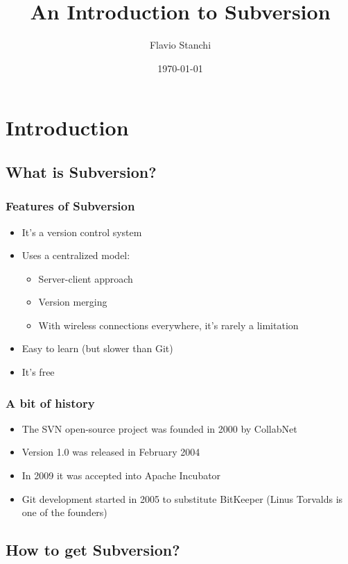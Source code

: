 \documentclass{beamer}
\title{An Introduction to Subversion}
\author{Flavio Stanchi}
\date{\today}
\begin{document}
\frame{\titlepage}

\section{Introduction}
\frame{\tableofcontents[currentsection]}

\subsection{What is Subversion?}

\frame
{
  \frametitle{Features of Subversion}

  \begin{itemize}
  \item<1-> It's a version control system
  \item<2-> Uses a centralized model:
  	\begin{itemize}
  	\item<2-> Server-client approach
  	\item<3-> Version merging
	\item<4-> With wireless connections everywhere, it's rarely a limitation
  	\end{itemize}
  \item<5-> Easy to learn (but slower than Git)
  \item<6-> It's free
  \end{itemize}
}

\frame
{
  \frametitle{A bit of history}

  \begin{itemize}
  \item<1-> The SVN open-source project was founded in 2000 by CollabNet 
  \item<2-> Version 1.0 was released in February 2004
  \item<3-> In 2009 it was accepted into Apache Incubator
  \item<4-> Git development started in 2005 to substitute BitKeeper (Linus Torvalds is one of the founders)
  \end{itemize}
}

\subsection{How to get Subversion?}
\end{document}
